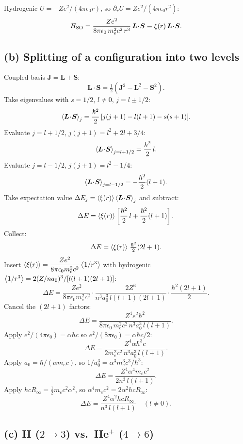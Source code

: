 \documentclass[11pt]{article}
\begin{document}
Hydrogenic $U=-Ze^{2}/(4\pi\epsilon_0 r)$, so $\partial_r U=Ze^{2}/(4\pi\epsilon_0 r^{2})$:
\begin{equation}
H_{\rm SO}=\frac{Ze^{2}}{8\pi\epsilon_0\,m_e^{2}c^{2}\,r^{3}}\,\bm L\!\cdot\!\bm S\equiv\xi(r)\,\bm L\!\cdot\!\bm S.
\label{eq:HSO-H}
\end{equation}

\subsection*{(b) Splitting of a configuration into two levels}

Coupled basis $\bm J=\bm L+\bm S$:
\[
\bm L\!\cdot\!\bm S=\tfrac12(\bm J^{2}-\bm L^{2}-\bm S^{2}).
\]
Take eigenvalues with $s=1/2$, $l\neq 0$, $j=l\pm 1/2$:
\[
\Braket{\bm L\!\cdot\!\bm S}_{j}=\frac{\hbar^{2}}{2}\,[j(j+1)-l(l+1)-s(s+1)].
\]
Evaluate $j=l+1/2$, $j(j+1)=l^{2}+2l+3/4$:
\[
\Braket{\bm L\!\cdot\!\bm S}_{j=l+1/2}=\frac{\hbar^{2}}{2}\,l.
\]
Evaluate $j=l-1/2$, $j(j+1)=l^{2}-1/4$:
\[
\Braket{\bm L\!\cdot\!\bm S}_{j=l-1/2}=-\frac{\hbar^{2}}{2}(l+1).
\]
Take expectation value $\Delta E_j=\Braket{\xi(r)}\Braket{\bm L\!\cdot\!\bm S}_j$ and subtract:
\[
\Delta E=\Braket{\xi(r)}\left[\frac{\hbar^{2}}{2}\,l+\frac{\hbar^{2}}{2}(l+1)\right].
\]
Collect:
\[
\Delta E=\Braket{\xi(r)}\,\tfrac{\hbar^{2}}{2}(2l+1).
\]
Insert $\Braket{\xi(r)}=\dfrac{Ze^{2}}{8\pi\epsilon_0 m_e^{2}c^{2}}\Braket{1/r^{3}}$ with hydrogenic $\Braket{1/r^3}=2(Z/na_0)^3/[l(l+1)(2l+1)]$:
\[
\Delta E=\frac{Ze^{2}}{8\pi\epsilon_0 m_e^{2}c^{2}}\cdot\frac{2 Z^{3}}{n^{3}a_0^{3}\,l(l+1)(2l+1)}\cdot\frac{\hbar^{2}(2l+1)}{2}.
\]
Cancel the $(2l+1)$ factors:
\[
\Delta E=\frac{Z^{4} e^{2}\hbar^{2}}{8\pi\epsilon_0\,m_e^{2}c^{2}\,n^{3}a_0^{3}\,l(l+1)}.
\]
Apply $e^2/(4\pi\epsilon_0)=\alpha\hbar c$ so $e^2/(8\pi\epsilon_0)=\alpha\hbar c/2$:
\[
\Delta E=\frac{Z^{4}\alpha\hbar^{3}c}{2 m_e^{2}c^{2}\,n^{3}a_0^{3}\,l(l+1)}.
\]
Apply $a_0=\hbar/(\alpha m_e c)$, so $1/a_0^{3}=\alpha^{3}m_e^{3}c^{3}/\hbar^{3}$:
\[
\Delta E=\frac{Z^{4}\alpha^{4} m_e c^{2}}{2 n^{3}\,l(l+1)}.
\]
Apply $hcR_\infty=\tfrac12 m_e c^{2}\alpha^{2}$, so $\alpha^{4}m_e c^{2}=2\alpha^{2}hcR_\infty$:
\begin{equation}
\boxed{\;\Delta E=\frac{Z^{4}\alpha^{2}hcR_{\infty}}{n^{3}\,l(l+1)}\quad(l\neq 0).\;}
\label{eq:DeltaE-final}
\end{equation}

\subsection*{(c) H ($2\to 3$) vs.\ He$^+$ ($4\to 6$)}
\end{document}
